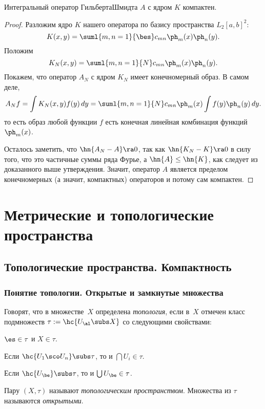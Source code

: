 \documentclass[a4paper]{article}
\begin{document}
\begin{theorem}
Интегральный оператор Гильберта\ч Шмидта $A$ с ядром $K$ компактен.
\end{theorem}
\begin{proof}
Разложим ядро $K$ нашего оператора по базису пространства $L_2[a,b]^2$:
$$K(x,y) = \suml{m,n=1}{\bes} c_{mn} \ph_m(x)\ph_n(y).$$
Положим
$$K_N(x,y) = \suml{m,n=1}{N} c_{mn} \ph_m(x)\ph_n(y).$$
Покажем, что оператор $A_N$ с ядром $K_N$ имеет конечномерный образ. В самом деле,
$$A_N f = \int K_N(x,y) f(y)\,dy = \suml{m,n=1}{N} c_{mn} \ph_m(x) \int f(y) \ph_n(y) \,dy.$$
то есть образ любой функции $f$ есть конечная линейная комбинация функций $\ph_m(x)$.

Осталось заметить, что $\hn{A_N - A} \ra 0$, так как $\hn{K_N - K} \ra 0$
в силу того, что это частичные суммы ряда Фурье, а $\hn{A} \le \hn{K}$, как следует
из доказанного выше утверждения. Значит, оператор $A$ является пределом конечномерных (а значит,
компактных) операторов и потому сам компактен.
\end{proof}

\section{Метрические и топологические пространства}

\subsection{Топологические пространства. Компактность}

\subsubsection{Понятие топологии. Открытые и замкнутые множества}

\begin{df}
Говорят, что в множестве~$X$ определена \emph{топология}, если в~$X$ отмечен класс подмножеств
$\tau := \hc{U_\al \subs X}$ со
следующими свойствами:
\begin{items}{-3}
\item $\es \in \tau$ и $X \in \tau$.
\item Если $\hc{U_1\sco U_n} \subs \tau$, то и $\bigcap U_i  \in \tau$.
\item Если $\hc{U_\be} \subs \tau$, то и $\bigcup U_\be  \in \tau$.
\end{items}
Пару $(X, \tau)$ называют \emph{топологическим пространством}. Множества из $\tau$ называются \emph{открытыми}.
\end{df}
\end{document}
